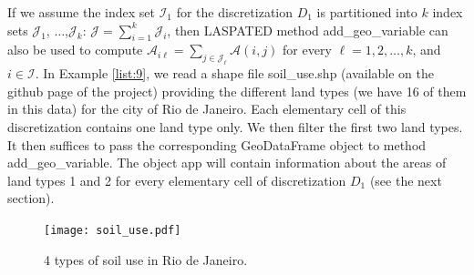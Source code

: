 \documentclass[article]{jss}
\newcommand{\ignore}[1]{}
\begin{document}
\begin{itemize}
{If we assume the index set $\mathcal{I}_{1}$ for the discretization $D_{1}$ is partitioned into $k$ index sets $\mathcal{J}_{1}$, $\ldots$,$\mathcal{J}_{k}$: $\mathcal{J}=\sum_{i=1}^k \mathcal{J}_i$, then LASPATED method add\_geo\_variable can also be used to compute $\mathcal{A}_{i \ell} = \displaystyle \sum_{j \in \mathcal{J}_{\ell}} \mathcal{A}(i,j)$ for every $\ell=1,2,\ldots,k$, and $i \in \mathcal{I}$.
In Example \ref{list:9}, we read a shape file soil\_use.shp (available on the github page of the project) providing the different land types (we have 16 of them in this data) for the city of Rio de Janeiro.
Each elementary cell of this discretization contains one land type only.
We then filter the first two land types.
It then suffices to pass the corresponding GeoDataFrame object to method add\_geo\_variable.
The object app will contain information about the areas of land types 1 and 2 for every elementary
cell of discretization $D_{1}$ (see the next section).
}
\end{itemize}

\begin{figure}
    \centering
    \texttt{[image: soil\_use.pdf]}
    \caption{4 types of soil use in Rio de Janeiro.}
    \label{fig:soil_use}
\end{figure}

\ignore{
\begin{lstlisting}[label={list:9},caption=Additional discretization features.]
import geopandas as gpd
population = gpd.read_file(r'../Data/regressors/population/population.shp')
population = population[["population", "geometry"]].copy()
app.add_geo_variable(population)

land_use = gpd.read_file(r'../Data/regressors/soil_use/soil_use.shp')
land_use = land_use[["type_{1}", "type_{2}", "geometry"]].copy()
app.add_geo_variable(land_use)
\end{lstlisting}
}
\end{document}
